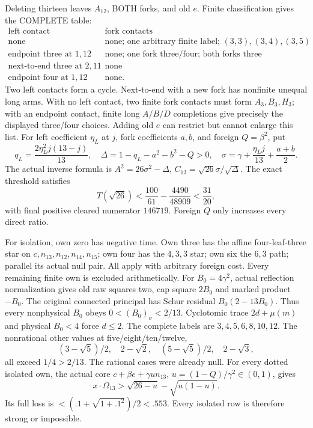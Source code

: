 \documentclass[11pt]{article}
\begin{document}
Deleting thirteen leaves \(A_{12}\), BOTH forks,
and old \(e\).
Finite classification gives the COMPLETE table:
\[
\begin{array}{c|l}
 \text{left contact}&\text{fork contacts}\\ \hline
 \text{none}&
 \text{none; one arbitrary finite label; }
                 (3,3),(3,4),(3,5)\\
 \text{endpoint three at }1,12&
 \text{none; one fork three/four; both forks three}\\
 \text{next-to-end three at }2,11&\text{none}\\
 \text{endpoint four at }1,12&\text{none}.
\end{array}
\]
Two left contacts form a cycle.
Next-to-end with a new fork has nonfinite unequal
long arms.
With no left contact, two finite fork contacts must
form \(A_3,B_3,H_3\); with an endpoint contact,
finite long \(A/B/D\) completions give precisely the
displayed three/four choices.
Adding old \(e\) can restrict but cannot enlarge this list.
For left coefficient \(\eta_L\) at \(j\), fork
coefficients \(a,b\), and foreign \(Q=\beta^2\), put
\[
 q_L={\frac{2\eta_L^2j(13-j)}{13}},\quad
 \Delta=1-q_L-a^2-b^2-Q>0,\quad
 \sigma=\gamma+{\frac{\eta_Lj}{13}}+{\frac{a+b}{2}}.
\]
The actual inverse formula is
\(A^2=26\sigma^2-\Delta\),
\(C_{13}=\sqrt{26}\sigma/\sqrt\Delta\).
The exact threshold satisfies
\[
 T(\sqrt{26})<{\frac{100}{61}}-{\frac{4490}{48909}}<{\frac{31}{20}},
\]
with final positive cleared numerator \(146719\).
Foreign \(Q\) only increases every direct ratio.

For isolation, own zero has negative time.
Own three has the affine four-leaf-three star on
\(c,n_{13},n_{12},n_{14},n_{15}\);
own four has the \(4,3,3\) star; own six the \(6,3\)
path; parallel its actual null pair.
All apply with arbitrary foreign cost.
Every remaining finite own is excluded arithmetically.
For \(B_0=4\gamma^2\), actual reflection normalization
gives old raw squares two, cap square \(2B_0\) and
marked product \(-B_0\).
The original connected principal has Schur residual
\(B_0(2-13B_0)\).
Thus every nonphysical \(B_0\) obeys
\(0<(B_0)_\sigma<2/13\).
Cyclotomic trace \(2d+\mu(m)\) and physical \(B_0<4\)
force \(d\le2\).
The complete labels are \(3,4,5,6,8,10,12\).
The nonrational other values at five/eight/ten/twelve,
\[
 (3-\sqrt5)/2,\quad2-\sqrt2,\quad
 (5-\sqrt5)/2,\quad2-\sqrt3,
\]
all exceed \(1/4>2/13\).
The rational cases were already null.
For every dotted isolated own, the actual core
\(c+\beta e+\gamma u n_{13}\),
\(u=(1-Q)/\gamma^2\in(0,1)\), gives
\[
 x\cdot\Omega_{13}>
           \sqrt{26-u}-\sqrt{u(1-u)}.
\]
Its full loss is \(<(.1+\sqrt{1+.1^2})/2<.553\).
Every isolated row is therefore strong or impossible.
\end{document}
